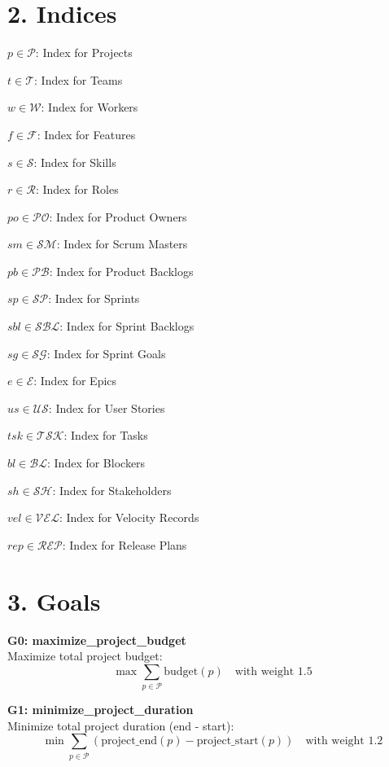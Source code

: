 \documentclass[12pt]{article}
\begin{document}
\section{2. Indices}
\item $ p \in \mathcal{P} $: Index for Projects
    \item $ t \in \mathcal{T} $: Index for Teams
    \item $ w \in \mathcal{W} $: Index for Workers
    \item $ f \in \mathcal{F} $: Index for Features
    \item $ s \in \mathcal{S} $: Index for Skills
    \item $ r \in \mathcal{R} $: Index for Roles
    \item $ po \in \mathcal{PO} $: Index for Product Owners
    \item $ sm \in \mathcal{SM} $: Index for Scrum Masters
    \item $ pb \in \mathcal{PB} $: Index for Product Backlogs
    \item $ sp \in \mathcal{SP} $: Index for Sprints
    \item $ sbl \in \mathcal{SBL} $: Index for Sprint Backlogs
    \item $ sg \in \mathcal{SG} $: Index for Sprint Goals
    \item $ e \in \mathcal{E} $: Index for Epics
    \item $ us \in \mathcal{US} $: Index for User Stories
    \item $ tsk \in \mathcal{TSK} $: Index for Tasks
    \item $ bl \in \mathcal{BL} $: Index for Blockers
    \item $ sh \in \mathcal{SH} $: Index for Stakeholders
    \item $ vel \in \mathcal{VEL} $: Index for Velocity Records
    \item $ rep \in \mathcal{REP} $: Index for Release Plans

\section{3. Goals}
\item \textbf{G0: maximize\_project\_budget} \\
    Maximize total project budget: 
    \[
    \max \sum_{p \in \mathcal{P}} \text{budget}(p) \quad \text{with weight } 1.5
    \]

    \item \textbf{G1: minimize\_project\_duration} \\
    Minimize total project duration (end - start): 
    \[
    \min \sum_{p \in \mathcal{P}} (\text{project\_end}(p) - \text{project\_start}(p)) \quad \text{with weight } 1.2
    \]
\end{document}
